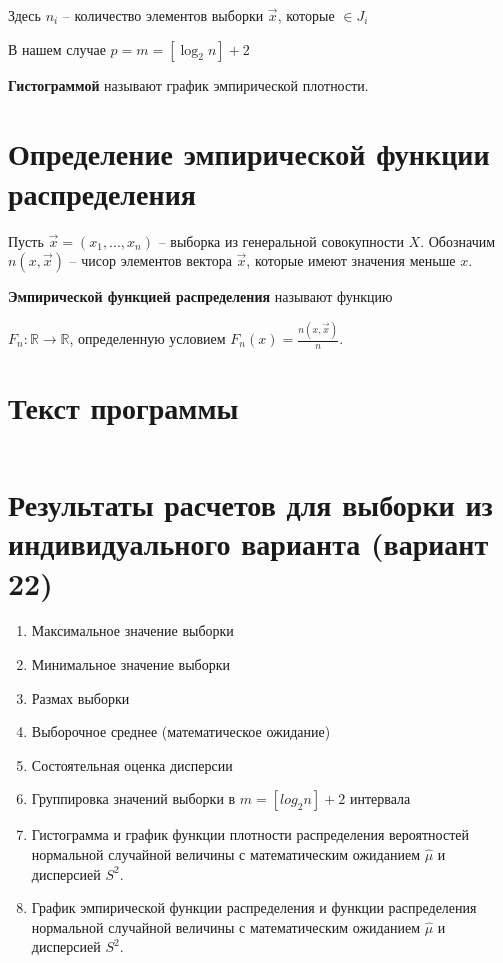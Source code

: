 \documentclass[a4paper,oneside,12pt]{extreport}
\theoremstyle{indented}
\begin{document}
    Здесь $n_i$ -- количество элементов выборки $\vec x$, которые
    $\in J_i$
    
    \hfill
    
    В нашем случае $p=m=[\log_2n] +2$
    
    \hfill

\textbf{Гистограммой} называют график эмпирической плотности. 

\section{Определение эмпирической функции распределения}

\hfill 

Пусть $\vec x = (x_1, ..., x_n)$ -- выборка из генеральной совокупности $X$. Обозначим $n(x, \vec x)$ -- чисор элементов вектора $\vec x$, которые имеют значения меньше $x$.

\hfill

\textbf{Эмпирической функцией распределения} называют функцию 

$F_n : \mathbb{R} \to \mathbb{R}$, определенную условием $F_n(x) = \frac{n(x, \vec x)}{n}$. 

\section{Текст программы}

\hfill 

\begin{lstlisting}

\end{lstlisting}

\section{Результаты расчетов для выборки из индивидуального варианта (вариант 22)} 

\begin{enumerate}
\item Максимальное значение выборки
\item Минимальное значение выборки
\item Размах выборки
\item Выборочное среднее (математическое ожидание)
\item Состоятельная оценка дисперсии
\item Группировка значений выборки в $m = [log_2 n] + 2$ интервала


\item Гистограмма и график функции плотности распределения вероятностей нормальной случайной величины с математическим ожиданием $\hat \mu$ и дисперсией $S^2$. 


\newpage

\item График эмпирической функции распределения и функции распределения нормальной случайной величины с математическим ожиданием $\hat \mu$ и дисперсией $S^2$. 


\end{enumerate}
\end{document}
